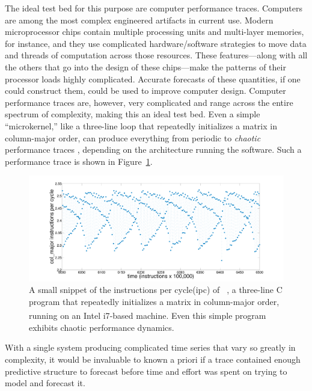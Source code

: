 The ideal test bed for this purpose are computer performance traces. Computers are among the most complex engineered artifacts in current
use.  Modern microprocessor chips contain multiple processing units
and multi-layer memories, for instance, and they use complicated
hardware/software strategies to move data and threads of computation
across those resources.  These features---along with all the others
that go into the design of these chips---make the patterns of their
processor loads highly complicated. Accurate forecasts of these quantities, if one could
construct them, could be used to improve computer design. 
 Computer performance traces are, however, very
complicated and range across the entire spectrum of complexity, making this an ideal test bed.  Even a simple ``microkernel,'' like a three-line loop that
repeatedly initializes a matrix in column-major order, can produce everything from periodic to
{\sl chaotic} performance traces \cite{mytkowicz09}, depending on the architecture running the software. Such a performance trace is shown in
Figure~\ref{fig:ipc}.%
%
 \begin{figure}[htbp]
    \centering
    \includegraphics[width=\textwidth]{figs/colshortts}
    \caption{A small snippet of the instructions per cycle(ipc) of {\tt
        \col}, a three-line C program that repeatedly initializes
      a matrix in column-major order, running on an Intel i7\textsuperscript{\textregistered}-based machine.  Even this
      simple program exhibits chaotic performance dynamics.}
   \label{fig:ipc}
  \end{figure}
With a single system producing complicated time series that vary so greatly in complexity, it would be invaluable to known a priori if a trace contained enough predictive structure to forecast before time and effort was spent on trying to model and forecast it. 

